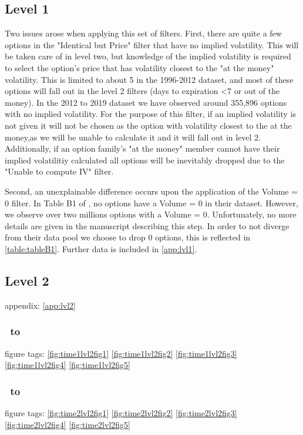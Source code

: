 \subsection{Level 1} 
Two issues arose when applying this set of filters. First, there are quite a few options in the "Identical but Price" filter that have no implied volatility. This will be taken care of in level two, but knowledge of the implied volatility is required to select the option's price that has volatility closest to the "at the money" volatility. This is limited to about 5 in the 1996-2012 dataset, and most of these options will fall out in the level 2 filters (days to expiration <7 or out of the money). In the 2012 to 2019 dataset we have observed around 355,896 options with no implied volatility. For the purpose of this filter, if an implied volatility is not given it will not be chosen as the option with volatility closest to the at the money,as we will be unable to calculate it and it will fall out in level 2. Additionally, if an option family's "at the money" member cannot have their implied volatilitiy calculated all options will be inevitably dropped due to the "Unable to compute IV" filter. 

Second, an unexplainable difference occurs upon the application of the Volume = 0 filter. In Table B1 of \citet{constantinides2013}, no options have a Volume = 0 in their dataset. However, we observe over two millions options  with a Volume = 0. Unfortunately, no more details are given in the manuscript describing this step. In order to not diverge from their data pool we choose to drop 0 options, this is reflected in \autoref{table:tableB1}. Further data is included in \autoref{app:lvl1}. 


\subsection {Level 2}

appendix: \autoref{app:lvl2}

\subsubsection{\STARTONE\ to \ENDONE }
figure tags: 
\autoref{fig:time1lvl2fig1}
\autoref{fig:time1lvl2fig2}
\autoref{fig:time1lvl2fig3}
\autoref{fig:time1lvl2fig4}
\autoref{fig:time1lvl2fig5}

\subsubsection{\STARTTWO\ to \ENDTWO }
figure tags: 
\autoref{fig:time2lvl2fig1}
\autoref{fig:time2lvl2fig2}
\autoref{fig:time2lvl2fig3}
\autoref{fig:time2lvl2fig4}
\autoref{fig:time2lvl2fig5}


